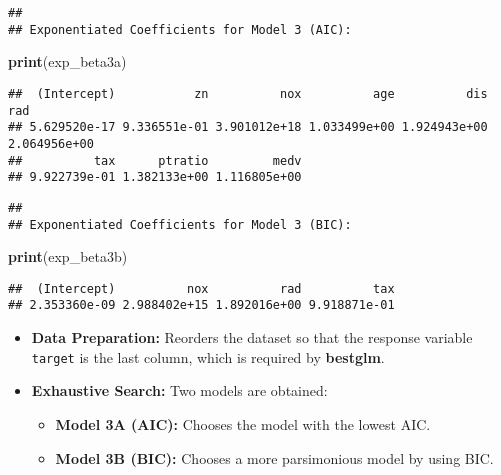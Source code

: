 \documentclass[
]{article}
\newenvironment{Shaded}{\begin{snugshade}}{\end{snugshade}}
\newcommand{\CommentTok}[1]{\textcolor[rgb]{0.56,0.35,0.01}{\textit{#1}}}
\newcommand{\FunctionTok}[1]{\textcolor[rgb]{0.13,0.29,0.53}{\textbf{#1}}}
\newcommand{\NormalTok}[1]{#1}
\newcommand{\OtherTok}[1]{\textcolor[rgb]{0.56,0.35,0.01}{#1}}
\newcommand{\SpecialCharTok}[1]{\textcolor[rgb]{0.81,0.36,0.00}{\textbf{#1}}}
\newcommand{\StringTok}[1]{\textcolor[rgb]{0.31,0.60,0.02}{#1}}
\begin{document}
\begin{verbatim}
## 
## Exponentiated Coefficients for Model 3 (AIC):
\end{verbatim}

\begin{Shaded}
\begin{Highlighting}[]
\FunctionTok{print}\NormalTok{(exp\_beta3a)}
\end{Highlighting}
\end{Shaded}

\begin{verbatim}
##  (Intercept)           zn          nox          age          dis          rad 
## 5.629520e-17 9.336551e-01 3.901012e+18 1.033499e+00 1.924943e+00 2.064956e+00 
##          tax      ptratio         medv 
## 9.922739e-01 1.382133e+00 1.116805e+00
\end{verbatim}

\begin{Shaded}
\end{Shaded}

\begin{verbatim}
## 
## Exponentiated Coefficients for Model 3 (BIC):
\end{verbatim}

\begin{Shaded}
\begin{Highlighting}[]
\FunctionTok{print}\NormalTok{(exp\_beta3b)}
\end{Highlighting}
\end{Shaded}

\begin{verbatim}
##  (Intercept)          nox          rad          tax 
## 2.353360e-09 2.988402e+15 1.892016e+00 9.918871e-01
\end{verbatim}

\begin{itemize}
\item
  \textbf{Data Preparation:} Reorders the dataset so that the response
  variable \texttt{target} is the last column, which is required by
  \textbf{bestglm}.
\item
  \textbf{Exhaustive Search:} Two models are obtained:

  \begin{itemize}
  \item
    \textbf{Model 3A (AIC):} Chooses the model with the lowest AIC.
  \item
    \textbf{Model 3B (BIC):} Chooses a more parsimonious model by using
    BIC.
  \end{itemize}
\end{itemize}
\end{document}
